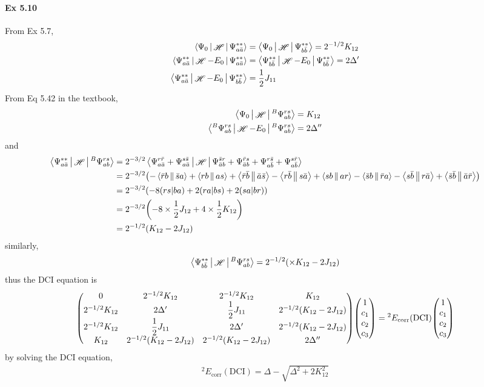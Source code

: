 \documentclass[a4paper]{article}
\DeclareMathOperator{\sH}{\mathscr{H}}
\DeclareMathOperator{\corr}{\mathrm{corr}}
\newcommand{\ex}[1]{\paragraph{Ex #1}}
\numberwithin{equation}{subsection}
\begin{document}
\ex{5.10}
From Ex 5.7,
\begin{align}
\Braket{\Psi_0 | \sH | \Psi_{a\bar{a}}^{**}} &= \Braket{\Psi_0 | \sH | \Psi_{b\bar{b}}^{**}} = 2^{-1/2}K_{12} \\
\Braket{\Psi_{a\bar{a}}^{**} | \sH-E_0 | \Psi_{a\bar{a}}^{**}} &= \Braket{\Psi_{b\bar{b}}^{**} | \sH-E_0 | \Psi_{b\bar{b}}^{**}} = 2\Delta' \\
\Braket{\Psi_{a\bar{a}}^{**} | \sH-E_0 | \Psi_{b\bar{b}}^{**}} &= \dfrac{1}{2}J_{11}
\end{align}
From Eq 5.42 in the textbook,
\begin{align}
\Braket{\Psi_0 | \sH | {^B}\Psi_{ab}^{rs}} &= K_{12} \\
\Braket{{^B}\Psi_{ab}^{rs} | \sH-E_0 | {^B}\Psi_{ab}^{rs}} &= 2\Delta''
\end{align}
and
\begin{align}
\Braket{\Psi_{a\bar{a}}^{**} | \sH | {^B}\Psi_{ab}^{rs}} &= 2^{-3/2}\Braket{\Psi_{a\bar{a}}^{r\bar{r}} + \Psi_{a\bar{a}}^{s\bar{s}} | \sH | \Psi_{\bar{a}b}^{\bar{s}r} + \Psi_{\bar{a}b}^{\bar{r}s} + \Psi_{a\bar{b}}^{r\bar{s}} + \Psi_{a\bar{b}}^{s\bar{r}} } \notag\\
&= 2^{-3/2} \qty(
-\Braket{\bar{r}b||\bar{s}a} + \Braket{rb||as} 
+ \Braket{\bar{r}\bar{b}||\bar{a}\bar{s}} - \Braket{r\bar{b}||s\bar{a}}
+ \Braket{sb||ar} - \Braket{\bar{s}b||\bar{r}a} 
- \Braket{s\bar{b}||r\bar{a}} + \Braket{\bar{s}\bar{b}||\bar{a}\bar{r}}
) \notag\\
&= 2^{-3/2} \qty( -8(rs|ba) + 2(ra|bs) + 2(sa|br) ) \notag\\
&= 2^{-3/2} \qty( -8\times \dfrac{1}{2}J_{12} + 4\times\dfrac{1}{2} K_{12}) \notag\\
&= 2^{-1/2} \qty( K_{12} - 2J_{12} )
\end{align}
similarly,
\begin{equation}\label{key}
\Braket{\Psi_{b\bar{b}}^{**} | \sH | {^B}\Psi_{ab}^{rs}} = 2^{-1/2} \qty( \times K_{12} - 2J_{12} )
\end{equation}
thus the DCI equation is
\begin{equation}\label{key}
\mqty( 0 & 2^{-1/2}K_{12} & 2^{-1/2}K_{12} & K_{12} \\
2^{-1/2}K_{12} & 2\Delta' & \dfrac{1}{2}J_{11} & 2^{-1/2} \qty( K_{12} - 2J_{12})\\
2^{-1/2}K_{12} & \dfrac{1}{2}J_{11} & 2\Delta' & 2^{-1/2} \qty(K_{12} - 2J_{12})\\
K_{12} & 2^{-1/2} \qty( K_{12} - 2J_{12} ) & 2^{-1/2} \qty( K_{12} - 2J_{12} ) & 2\Delta'' ) \mqty(1\\ c_1 \\ c_2 \\ c_3)
= {^2}E_{\corr}(\text{DCI}) \mqty(1\\ c_1 \\ c_2 \\ c_3)
\end{equation}
by solving the DCI equation,
\begin{align}
{^2}E_{\corr}(\text{DCI}) = \Delta - \sqrt{\Delta^2 + 2K_{12}^2}
\end{align}
\end{document}
